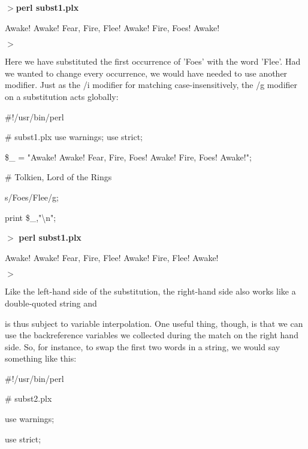 \documentclass[a4paper,11pt]{book}
\begin{document}
\noindent 

\noindent $>$\textbf{perl subst1.plx}

\noindent Awake! Awake! Fear, Fire, Flee! Awake! Fire, Foes! Awake!

\noindent $>$

\noindent 

\noindent Here we have substituted the first occurrence of 'Foes' with the word 'Flee'. Had we wanted to change every occurrence, we would have needed to use another modifier. Just as the /i modifier for matching case-insensitively, the /g modifier on a substitution acts globally:

\noindent 

\noindent \#!/usr/bin/perl

\noindent \# subst1.plx use warnings; use strict;

\noindent 

\noindent \$\_  = "Awake! Awake! Fear, Fire, Foes! Awake! Fire, Foes! Awake!";

\noindent \# Tolkien, Lord of the Rings

\noindent 

\noindent s/Foes/Flee/g;

\noindent print \$\_,"\textbackslash n";

\noindent 

\noindent $>$ \textbf{perl subst1.plx}

\noindent Awake! Awake! Fear, Fire, Flee! Awake! Fire, Flee! Awake!

\noindent $>$

\noindent 

\noindent 

\noindent Like the left-hand side of the substitution, the right-hand side also works like a double-quoted string and

\noindent is thus subject to variable interpolation. One useful thing, though, is that we can use the backreference variables we collected during the match on the right hand side. So, for instance, to swap the first two words in a string, we would say something like this:

\noindent 

\noindent 

\noindent \#!/usr/bin/perl

\noindent \# subst2.plx

\noindent use warnings;

\noindent use strict;

\noindent 
\end{document}

